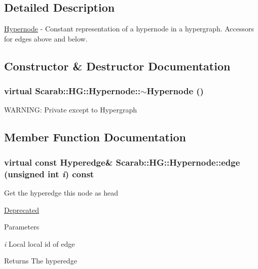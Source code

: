 \subsection{Detailed Description}
\hyperlink{class_scarab_1_1_h_g_1_1_hypernode}{Hypernode} -\/ Constant representation of a hypernode in a hypergraph. Accessors for edges above and below. 

\subsection{Constructor \& Destructor Documentation}
\hypertarget{class_scarab_1_1_h_g_1_1_hypernode_a0657cc96f62d29da3ae4b5b9bcab1ce6}{
\subsubsection[{$\sim$Hypernode}]{\setlength{\rightskip}{0pt plus 5cm}virtual Scarab::HG::Hypernode::$\sim$Hypernode ()}}
\label{class_scarab_1_1_h_g_1_1_hypernode_a0657cc96f62d29da3ae4b5b9bcab1ce6}
WARNING: Private except to Hypergraph 

\subsection{Member Function Documentation}
\hypertarget{class_scarab_1_1_h_g_1_1_hypernode_a3bface6832eb54a00d90e4fe8d1999f7}{
\subsubsection[{edge}]{\setlength{\rightskip}{0pt plus 5cm}virtual const {\bf Hyperedge}\& Scarab::HG::Hypernode::edge (unsigned int {\em i}) const}}
\label{class_scarab_1_1_h_g_1_1_hypernode_a3bface6832eb54a00d90e4fe8d1999f7}
Get the hyperedge this node as head \begin{Desc}
\item[\hyperlink{deprecated__deprecated000009}{Deprecated}]\end{Desc}

\begin{DoxyParams}{Parameters}
\item[{\em i}]Local local id of edge\end{DoxyParams}
\begin{DoxyReturn}{Returns}
The hyperedge 
\end{DoxyReturn}


